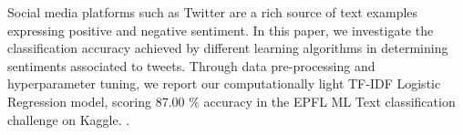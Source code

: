 Social media platforms such as Twitter are a rich source of text examples expressing positive and negative sentiment. 
In this paper, we investigate the classification accuracy achieved by different learning algorithms in determining sentiments associated to tweets.
Through data pre-processing and hyperparameter tuning, we report our computationally light TF-IDF Logistic Regression model, scoring 87.00 $\%$ accuracy in the EPFL ML Text classification challenge on Kaggle.
.
